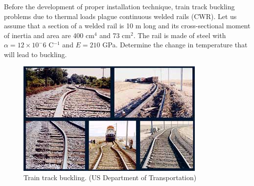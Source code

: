 \documentclass[
10pt,
a4paper,
openany,
svgnames,
]{kaobook} %
\begin{document}
\begin{example}
  Before the development of proper installation technique, train track buckling problems due to thermal loads plague continuous welded rails (CWR). Let us assume that a section of a welded rail is 10 m long and its cross-sectional moment of inertia and area are 400 cm$^4$ and 73 cm$^2$. The rail is made of steel with $\alpha = 12 \times 10^-6$ C$^{-1}$ and $E = 210$ GPa. Determine the change in temperature that will lead to buckling.

  \begin{figure}[H]
    \centering
    \includegraphics[scale=0.7]{pictures/Failure-theories/Rail_buckle}
    \caption{Train track buckling. (US Department of Transportation)}
  \end{figure}
\end{example}
\end{document}

